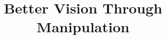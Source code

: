 \documentclass[]{article}
\begin{document}
 

\onecolumn



\title{Better Vision Through Manipulation}



\ifdraft
  \thispagestyle{plain}
  \pagestyle{plain}
\fi

























\end{document}
